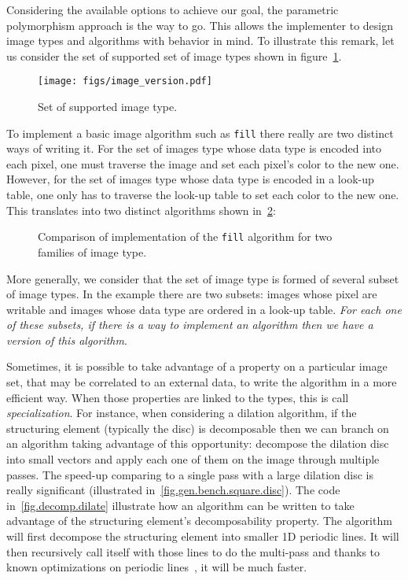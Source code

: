 Considering the available options to achieve our goal, the parametric polymorphism approach is the way to go. This
allows the implementer to design image types and algorithms with behavior in mind. To illustrate this remark, let us
consider the set of supported set of image types shown in figure~\ref{fig.image.version}.

\begin{figure}[tbh]
  \centering
  \texttt{[image: figs/image\_version.pdf]}
  \caption{Set of supported image type.}
  \label{fig.image.version}
\end{figure}

To implement a basic image algorithm such as \texttt{fill} there really are two distinct ways of writing it. For the
set of images type whose data type is encoded into each pixel, one must traverse the image and set each pixel's color
to the new one. However, for the set of images type whose data type is encoded in a look-up table, one only has to
traverse the look-up table to set each color to the new one. This translates into two distinct algorithms shown
in~\cref{traverse.vs.LUT}:

\begin{figure}[tbh]
  \centering
  \hfil

  \caption{Comparison of implementation of the \texttt{fill} algorithm for two
    families of image type.}
  \label{traverse.vs.LUT}
\end{figure}

More generally, we consider that the set of image type is formed of several subset of image types. In the example there
are two subsets: images whose pixel are writable and images whose data type are ordered in a look-up table. \emph{For
  each one of these subsets, if there is a way to implement an algorithm then we have a \emph{version} of this algorithm}.

Sometimes, it is possible to take advantage of a property on a particular image set, that may be correlated to an
external data, to write the algorithm in a more efficient way. When those properties are linked to the types, this is
call \emph{specialization}. For instance, when considering a dilation algorithm, if the structuring element (typically
the disc) is decomposable then we can branch on an algorithm taking advantage of this opportunity: decompose the
dilation disc into small vectors and apply each one of them on the image through multiple passes. The speed-up comparing
to a single pass with a large dilation disc is really significant (illustrated in~\ref{fig.gen.bench.square.disc}). The
code in~\ref{fig.decomp.dilate} illustrate how an algorithm can be written to take advantage of the structuring
element's decomposability property. The algorithm will first decompose the structuring element into smaller 1D periodic
lines. It will then recursively call itself with those lines to do the multi-pass and thanks to known optimizations on
periodic lines~\cite{vanherk.1992.localminmax}, it will be much faster.


